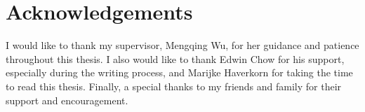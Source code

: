 \section*{Acknowledgements}

I would like to thank my supervisor, Mengqing Wu, for her guidance and patience throughout this thesis. I also would like to thank Edwin Chow for his support, especially during the writing process, and Marijke Haverkorn for taking the time to read this thesis.
Finally, a special thanks to my friends and family for their support and encouragement.